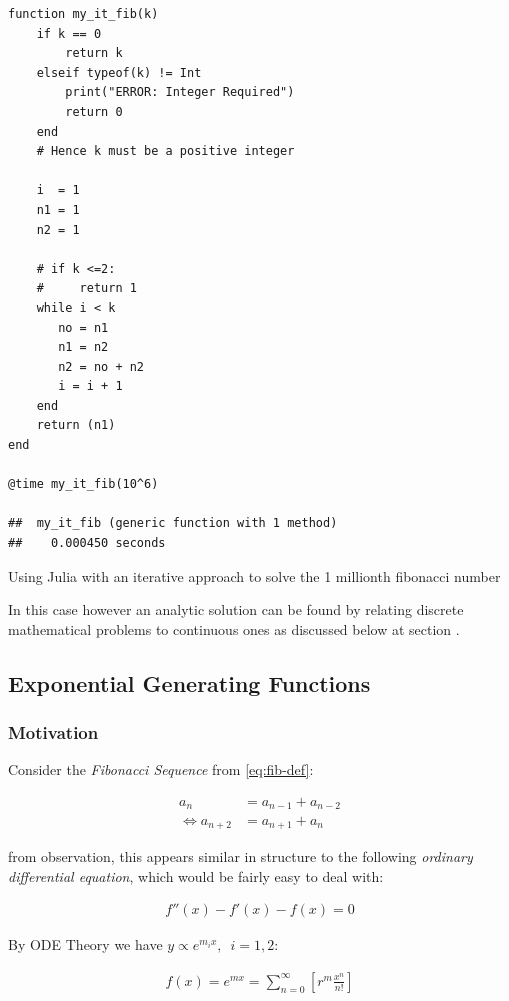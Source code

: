 \documentclass[11pt]{article}
\begin{document}
\begin{listing}[htbp]
\begin{verbatim}
function my_it_fib(k)
    if k == 0
        return k
    elseif typeof(k) != Int
        print("ERROR: Integer Required")
        return 0
    end
    # Hence k must be a positive integer

    i  = 1
    n1 = 1
    n2 = 1

    # if k <=2:
    #     return 1
    while i < k
       no = n1
       n1 = n2
       n2 = no + n2
       i = i + 1
    end
    return (n1)
end

@time my_it_fib(10^6)

##  my_it_fib (generic function with 1 method)
##    0.000450 seconds
\end{verbatim}
\caption{\label{julia-fib}Using Julia with an iterative approach to solve the 1 millionth fibonacci number}
\end{listing}

In this case however an analytic solution can be found by relating discrete
mathematical problems to continuous ones as discussed below at section .
\subsection{Exponential Generating Functions}
\label{exp-gen-func-fib-seq}
\subsubsection{Motivation}
\label{motivation}
Consider the \emph{Fibonacci Sequence} from \eqref{eq:fib-def}:


\begin{align}
    a_{n}&= a_{n - 1} + a_{n - 2} \nonumber \\
\iff a_{n+  2} &= a_{n+  1} +  a_n \label{eq:fib-def-shift}
\end{align}


from observation, this appears similar in structure to the following \emph{ordinary
differential equation}, which would be fairly easy to deal with:


\begin{align*}
f''\left( x \right)- f'\left( x \right)- f\left( x \right)=  0
\end{align*}

By ODE Theory we have \(y \propto e^{m_{i}x}, \enspace i = 1, 2\):

\begin{align*}
f\left( x \right)= e^{mx} = \sum^{\infty}_{n= 0}   \left[ r^{m} \frac{x^n}{n!} \right]
\end{align*}
\end{document}
